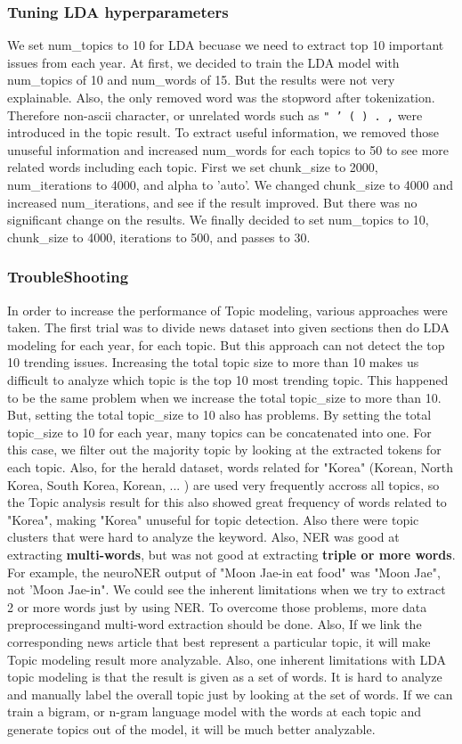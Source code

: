 \subsubsection{Tuning LDA hyperparameters}
We set num\_topics to 10 for LDA becuase we need to extract top 10 important issues from each year. At first, we decided to train the LDA model with num\_topics of 10 and num\_words of 15. But the results were not very explainable. Also, the only removed word was the stopword after tokenization. Therefore non-ascii character, or unrelated words such as
\texttt{" \xec ' ( ) . ,} were introduced in the topic result. To extract useful information, we removed those unuseful information and increased num\_words for each topics to 50 to see more related words including each topic. First we set chunk\_size to 2000, num\_iterations to 4000, and alpha to 'auto'. We changed chunk\_size to 4000 and increased num\_iterations, and see if the result improved. But there was no significant change on the results. We finally decided to set num\_topics to 10, chunk\_size to 4000, iterations to 500, and passes to 30.

\subsubsection{TroubleShooting}
In order to increase the performance of Topic modeling, various approaches were taken. The first trial was to divide news dataset into given sections then do LDA modeling for each year, for each topic. But this approach can not detect the top 10 trending issues. Increasing the total topic size to more than 10 makes us difficult to analyze which topic is the top 10 most trending topic. This happened to be the same problem when we increase the total topic\_size to more than 10.
But, setting the total topic\_size to 10 also has problems. By setting the total
topic\_size to 10 for each year, many topics can be concatenated into one. For
this case, we filter out the majority topic by looking at the extracted tokens
for each topic. Also, for the herald dataset, words related for "Korea" (Korean,
North Korea, South Korea, Korean, ... ) are used very frequently accross all
topics, so the Topic analysis result for this also showed great frequency of
words related to "Korea", making "Korea" unuseful for topic detection. Also
there were topic clusters that were hard to analyze the keyword. Also, NER was
good at extracting \textbf{multi-words}, but was not good at extracting
\textbf{triple or more words}. For example, the neuroNER output of "Moon Jae-in
eat food" was "Moon Jae", not 'Moon Jae-in". We could see the inherent
limitations when we try to extract 2 or more words just by using NER. To
overcome those problems, more data preprocessingand multi-word extraction should
be done. Also, If we link the corresponding news article that best represent a
particular topic, it will make Topic modeling result more analyzable. Also, one
inherent limitations with LDA topic modeling is that the result is given as a
set of words. It is hard to analyze and manually label the overall topic just by
looking at the set of words. If we can train a bigram, or n-gram language model
with the words at each topic and generate topics out of the model, it will be
much better analyzable.
